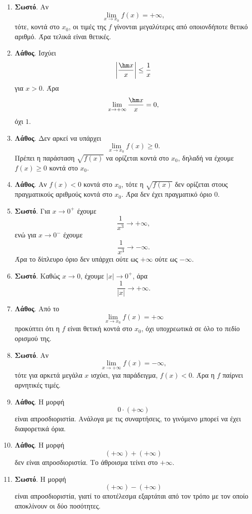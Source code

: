 \begin{enumerate}[label=\textbf{1.\arabic*.}]
\item \textbf{Σωστό}. Αν
\[
\lim_{x\to x_0}f(x)=+\infty,
\]
τότε, κοντά στο $x_0$, οι τιμές της $f$ γίνονται μεγαλύτερες από οποιονδήποτε θετικό αριθμό. Άρα τελικά είναι θετικές.

\item \textbf{Λάθος}. Ισχύει
\[
\left|\frac{\hm x}{x}\right|\leq \frac{1}{x}
\]
για $x>0$. Άρα
\[
\lim_{x\to+\infty}\frac{\hm x}{x}=0,
\]
όχι $1$.

\item \textbf{Λάθος}. Δεν αρκεί να υπάρχει
\[
\lim_{x\to x_0}f(x)\geq0.
\]
Πρέπει η παράσταση $\sqrt{f(x)}$ να ορίζεται κοντά στο $x_0$, δηλαδή να έχουμε $f(x)\geq0$ κοντά στο $x_0$.

\item \textbf{Λάθος}. Αν $f(x)<0$ κοντά στο $x_0$, τότε η $\sqrt{f(x)}$ δεν ορίζεται στους πραγματικούς αριθμούς κοντά στο $x_0$. Άρα δεν έχει πραγματικό όριο $0$.

\item \textbf{Σωστό}. Για $x\to0^+$ έχουμε
\[
\frac{1}{x^3}\to+\infty,
\]
ενώ για $x\to0^-$ έχουμε
\[
\frac{1}{x^3}\to-\infty.
\]
Άρα το δίπλευρο όριο δεν υπάρχει ούτε ως $+\infty$ ούτε ως $-\infty$.

\item \textbf{Σωστό}. Καθώς $x\to0$, έχουμε $|x|\to0^+$, άρα
\[
\frac{1}{|x|}\to+\infty.
\]

\item \textbf{Λάθος}. Από το
\[
\lim_{x\to x_0}f(x)=+\infty
\]
προκύπτει ότι η $f$ είναι θετική κοντά στο $x_0$, όχι υποχρεωτικά σε όλο το πεδίο ορισμού της.

\item \textbf{Σωστό}. Αν
\[
\lim_{x\to+\infty}f(x)=-\infty,
\]
τότε για αρκετά μεγάλα $x$ ισχύει, για παράδειγμα, $f(x)<0$. Άρα η $f$ παίρνει αρνητικές τιμές.

\item \textbf{Λάθος}. Η μορφή
\[
0\cdot(+\infty)
\]
είναι απροσδιοριστία. Ανάλογα με τις συναρτήσεις, το γινόμενο μπορεί να έχει διαφορετικά όρια.

\item \textbf{Λάθος}. Η μορφή
\[
(+\infty)+(+\infty)
\]
δεν είναι απροσδιοριστία. Το άθροισμα τείνει στο $+\infty$.

\item \textbf{Σωστό}. Η μορφή
\[
(+\infty)-(+\infty)
\]
είναι απροσδιοριστία, γιατί το αποτέλεσμα εξαρτάται από τον τρόπο με τον οποίο αποκλίνουν οι δύο ποσότητες.


\end{enumerate}
